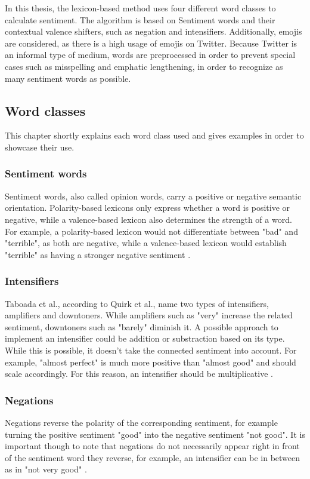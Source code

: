 In this thesis, the lexicon-based method uses four different word classes to calculate sentiment. The algorithm is based on Sentiment words and their contextual valence shifters, such as negation and intensifiers. Additionally, emojis are considered, as there is a high usage of emojis on Twitter. Because Twitter is an informal type of medium, words are preprocessed in order to prevent special cases such as misspelling and emphatic lengthening, in order to recognize as many sentiment words as possible.

\subsection{Word classes}
This chapter shortly explains each word class used and gives examples in order to showcase their use.

\subsubsection{Sentiment words}
Sentiment words, also called opinion words, carry a positive or negative semantic orientation. Polarity-based lexicons only express whether a word is positive or negative, while a valence-based lexicon also determines the strength of a word. For example, a polarity-based lexicon would not differentiate between "bad" and "terrible", as both are negative, while a valence-based lexicon would establish "terrible" as having a stronger negative sentiment \cite{DBLP:conf/icwsm/HuttoG14}.

\subsubsection{Intensifiers}
Taboada et al., according to Quirk et al., name two types of intensifiers, amplifiers and downtoners. While amplifiers such as "very" increase the related sentiment, downtoners such as "barely" diminish it. A possible approach to implement an intensifier could be addition or substraction based on its type. While this is possible, it doesn't take the connected sentiment into account. For example, "almost perfect" is much more positive than "almost good" and should scale accordingly. For this reason, an intensifier should be multiplicative \cite{taboada}.

\subsubsection{Negations}
Negations reverse the polarity of the corresponding sentiment, for example turning the positive sentiment "good" into the negative sentiment "not good". It is important though to note that negations do not necessarily appear right in front of the sentiment word they reverse, for example, an intensifier can be in between as in "not very good" \cite{taboada}.

